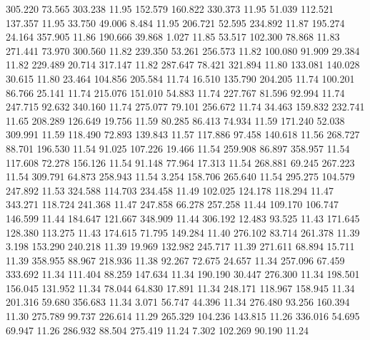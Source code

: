 305.220   73.565  303.238        11.95
 152.579  160.822  330.373        11.95
  51.039  112.521  137.357        11.95
  33.750   49.006    8.484        11.95
 206.721   52.595  234.892        11.87
 195.274   24.164  357.905        11.86
 190.666   39.868    1.027        11.85
  53.517  102.300   78.868        11.83
 271.441   73.970  300.560        11.82
 239.350   53.261  256.573        11.82
 100.080   91.909   29.384        11.82
 229.489   20.714  317.147        11.82
 287.647   78.421  321.894        11.80
 133.081  140.028   30.615        11.80
  23.464  104.856  205.584        11.74
  16.510  135.790  204.205        11.74
 100.201   86.766   25.141        11.74
 215.076  151.010   54.883        11.74
 227.767   81.596   92.994        11.74
 247.715   92.632  340.160        11.74
 275.077   79.101  256.672        11.74
  34.463  159.832  232.741        11.65
 208.289  126.649   19.756        11.59
  80.285   86.413   74.934        11.59
 171.240   52.038  309.991        11.59
 118.490   72.893  139.843        11.57
 117.886   97.458  140.618        11.56
 268.727   88.701  196.530        11.54
  91.025  107.226   19.466        11.54
 259.908   86.897  358.957        11.54
 117.608   72.278  156.126        11.54
  91.148   77.964   17.313        11.54
 268.881   69.245  267.223        11.54
 309.791   64.873  258.943        11.54
   3.254  158.706  265.640        11.54
 295.275  104.579  247.892        11.53
 324.588  114.703  234.458        11.49
 102.025  124.178  118.294        11.47
 343.271  118.724  241.368        11.47
 247.858   66.278  257.258        11.44
 109.170  106.747  146.599        11.44
 184.647  121.667  348.909        11.44
 306.192   12.483   93.525        11.43
 171.645  128.380  113.275        11.43
 174.615   71.795  149.284        11.40
 276.102   83.714  261.378        11.39
   3.198  153.290  240.218        11.39
  19.969  132.982  245.717        11.39
 271.611   68.894   15.711        11.39
 358.955   88.967  218.936        11.38
  92.267   72.675   24.657        11.34
 257.096   67.459  333.692        11.34
 111.404   88.259  147.634        11.34
 190.190   30.447  276.300        11.34
 198.501  156.045  131.952        11.34
  78.044   64.830   17.891        11.34
 248.171  118.967  158.945        11.34
 201.316   59.680  356.683        11.34
   3.071   56.747   44.396        11.34
 276.480   93.256  160.394        11.30
 275.789   99.737  226.614        11.29
 265.329  104.236  143.815        11.26
 336.016   54.695   69.947        11.26
 286.932   88.504  275.419        11.24
   7.302  102.269   90.190        11.24
